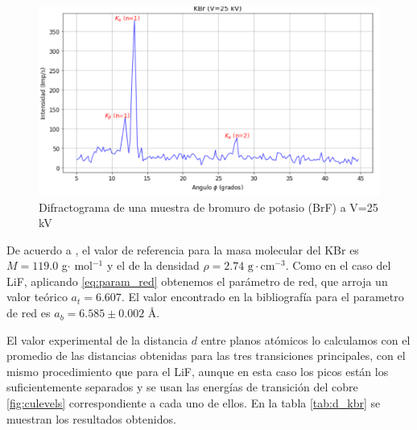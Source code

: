 \begin{figure}[H]
	\centering
	\begin{minipage}{0.7\textwidth} 
		\includegraphics[width=\textwidth]{grafico_2x03_difractograma_KBr.png}
		\caption{\footnotesize Difractograma de una muestra de bromuro de potasio (BrF) a V=25 kV}
		\label{fig:difractogramaa_KBr}
	\end{minipage}
\end{figure}


De acuerdo a \cite{KBr_quim}, el valor de referencia para la masa molecular del KBr es   $M=119.0$ g$\cdot$ mol$^{-1}$ y el de la densidad $\rho=2.74\text{ g}\cdot\text{cm}^{-3}$. Como en el caso del LiF, aplicando \ref{eq:param_red} obtenemos el parámetro de red, que arroja un valor teórico $a_t=6.607$. El valor encontrado en la bibliografía \cite{KBr_str} para el parametro de red  es $a_b=6.585\pm 0.002$ \AA.

\vspace{\baselineskip}

El valor experimental de la distancia $d$ entre planos atómicos lo calculamos con el promedio de las distancias obtenidas para las tres transiciones principales, con el mismo procedimiento que para el LiF, aunque en esta caso los picos están los suficientemente separados y se usan las energías de transición del cobre \ref{fig:culevels} correspondiente a cada uno de ellos. En la tabla \ref{tab:d_kbr} se muestran los resultados obtenidos.

\vspace{\baselineskip}

